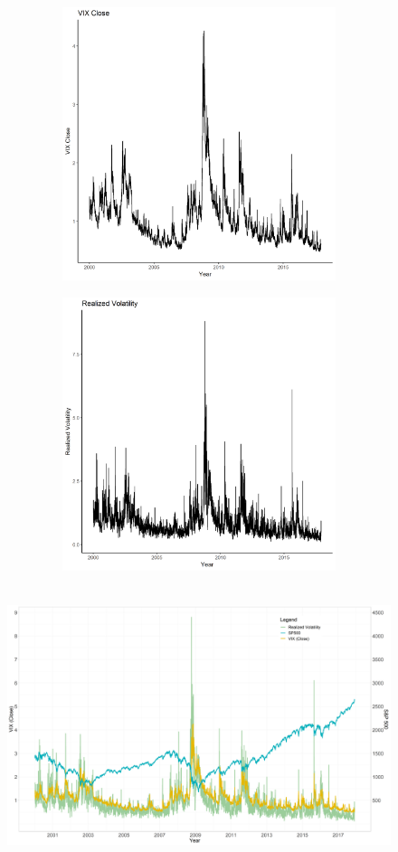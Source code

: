 \begin{figure}[!htbp]
\includegraphics[width=16cm, height=8cm]{pictures/vix.png}
\end{figure}
%
\begin{figure}[!htbp]
\includegraphics[width=16cm, height=8cm]{pictures/vol.png}
\end{figure}
%
\begin{figure}[!htbp]
\includegraphics[width=16cm, height=8cm]{pictures/SPandVolandViX.png}
\end{figure}

